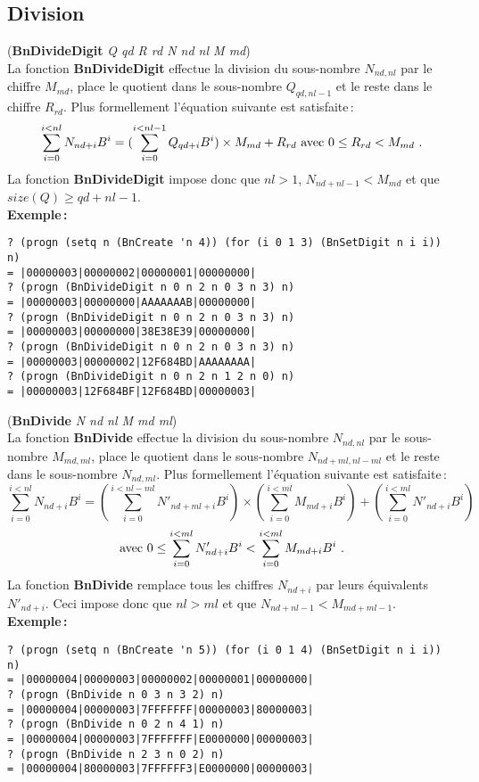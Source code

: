 \subsection{Division}
({\bf BnDivideDigit} {\em Q qd R rd N nd nl M md})
\\[12pt]
La fonction {\bf BnDivideDigit} effectue la division du sous-nombre
$N_{nd,nl}$ par le chiffre $M_{md}$, place le quotient dans le sous-nombre
$Q_{qd,nl-1}$ et le reste dans le chiffre $R_{rd}$. Plus formellement
l'\'equation suivante est satisfaite\,:
\[ \sum_{i=0}^{i<nl}N_{nd+i} B^i = (\sum_{i=0}^{i<nl-1}Q_{qd+i} B^i)\times M_{md} + R_{rd}\ {\rm avec}\ 0 \leq R_{rd} < M_{md}\ .\]
La fonction {\bf BnDivideDigit} impose donc
que $nl > 1$, $N_{nd+nl-1} < M_{md}$ et que $size(Q) \geq qd+nl-1$.
\\[18pt]
{\bf Exemple\,:}
\begin{verbatim}
? (progn (setq n (BnCreate 'n 4)) (for (i 0 1 3) (BnSetDigit n i i)) n)
= |00000003|00000002|00000001|00000000|
? (progn (BnDivideDigit n 0 n 2 n 0 3 n 3) n)
= |00000003|00000000|AAAAAAAB|00000000|
? (progn (BnDivideDigit n 0 n 2 n 0 3 n 3) n)
= |00000003|00000000|38E38E39|00000000|
? (progn (BnDivideDigit n 0 n 2 n 0 3 n 3) n)
= |00000003|00000002|12F684BD|AAAAAAAA|
? (progn (BnDivideDigit n 0 n 2 n 1 2 n 0) n)
= |00000003|12F684BF|12F684BD|00000003|
\end{verbatim}
\vspace*{24pt}
({\bf BnDivide} {\em N nd nl M md ml})
\\[12pt]
La fonction {\bf BnDivide} effectue la division du sous-nombre
$N_{nd,nl}$ par le sous-nombre $M_{md,ml}$, place le quotient dans le
sous-nombre $N_{nd+ml,nl-ml}$ et le reste dans le sous-nombre
$N_{nd,ml}$. Plus formellement l'\'equation suivante est satisfaite\,:
\[ \sum_{i=0}^{i<nl}N_{nd+i} B^i = (\sum_{i=0}^{i<nl-ml}N'_{nd+ml+i} B^i)\times (\sum_{i=0}^{i<ml}M_{md+i} B^i) + (\sum_{i=0}^{i<ml}N'_{nd+i} B^i) \]
\[ {\rm avec}\ 0 \leq  \sum_{i=0}^{i<ml}N'_{nd+i} B^i < \sum_{i=0}^{i<ml}M_{md+i} B^i\ .\]
La fonction {\bf BnDivide} remplace tous les chiffres $N_{nd+i}$ par leurs
\'equivalents $N'_{nd+i}$. Ceci impose donc que $nl > ml$ et que
$N_{nd+nl-1} < M_{md+ml-1}$.
\\[18pt]
{\bf Exemple\,:}
\begin{verbatim}
? (progn (setq n (BnCreate 'n 5)) (for (i 0 1 4) (BnSetDigit n i i)) n)
= |00000004|00000003|00000002|00000001|00000000|
? (progn (BnDivide n 0 3 n 3 2) n)
= |00000004|00000003|7FFFFFFF|00000003|80000003|
? (progn (BnDivide n 0 2 n 4 1) n)
= |00000004|00000003|7FFFFFFF|E0000000|00000003|
? (progn (BnDivide n 2 3 n 0 2) n)
= |00000004|80000003|7FFFFFF3|E0000000|00000003|
\end{verbatim}
